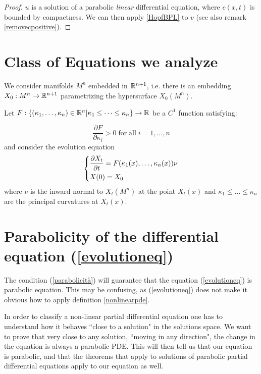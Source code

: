 \begin{proof}
	$u$ is a solution of a parabolic \textit{linear} differential equation, where  $c(x, t)$ is bounded by compactness. We can then apply \ref{HopfBPL} to $v$ (see also remark \ref{removecpositive}).
\end{proof}

\section{Class of Equations we analyze}

We consider manifolds $M^n$ embedded in $\mathbb{R}^{n+1}$, i.e. there is an embedding $X_0 : M^n \rightarrow \mathbb{R}^{n+1}$ parametrizing the hypersurface $X_0(M^n)$. 

Let $F:\{(\kappa_1, \dots , \kappa_n)\in \mathbb{R}^n\vert \kappa_1\leq \dots \leq \kappa_n\}\rightarrow \mathbb{R}$ be a $C^1$ function satisfying:

\begin{equation}
	\frac{\partial F}{\partial \kappa_i} > 0 \mathrm{\; for \; all } \; i=1,\dots, n \label{parabolicità}
\end{equation}
and consider the evolution equation 
\begin{align}
	\begin{dcases}
		\frac{\partial X_t}{\partial t} = F(\kappa_1(x), \dots , \kappa_n(x)) \nu\\
		X(0)= X_0
	\end{dcases} \label{evolutioneq}
\end{align}
where $\nu$ is the inward normal to $X_t(M^n)$ at the point $X_t(x)$ and $\kappa_1\leq \dots \leq \kappa_n$ are the principal curvatures at $X_t(x)$. 


\section{Parabolicity of the differential equation (\ref{evolutioneq})}\label{parabolic}


The condition (\ref{parabolicità}) will  guarantee that the equation (\ref{evolutioneq}) is  parabolic equation. This may be confusing, as (\ref{evolutioneq}) does not make it obvious how to apply definition \ref{nonlinearpde}. 

In order to classify a non-linear partial differential equation one has to understand how it behaves ``close to a solution" in the solutions space. We want to prove that very close to any solution, ``moving in any direction", the change in the equation is always a parabolic PDE. This will then tell us that our equation is parabolic, and that the theorems that apply to solutions of parabolic partial differential equations apply to our equation as well. 


